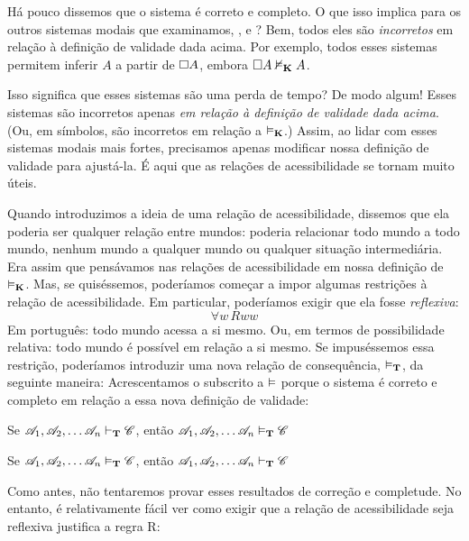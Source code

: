 Há pouco dissemos que o sistema \mlK{} é correto e completo. O que isso implica para os outros sistemas modais que examinamos, \mlT, \mlSfour{} e \mlSfive? Bem, todos eles são \emph{incorretos} em relação à definição de validade dada acima. Por exemplo, todos esses sistemas permitem inferir $A$ a partir de $\Box A$, embora $\Box A\nvDash_{\mathbf{K}} A$.

Isso significa que esses sistemas são uma perda de tempo? De modo algum! Esses sistemas são incorretos apenas \emph{em relação à definição de validade dada acima}. (Ou, em símbolos, são incorretos em relação a $\vDash_{\mathbf{K}}$.) Assim, ao lidar com esses sistemas modais mais fortes, precisamos apenas modificar nossa definição de validade para ajustá-la. É aqui que as relações de acessibilidade se tornam muito úteis.

Quando introduzimos a ideia de uma relação de acessibilidade, dissemos que ela poderia ser qualquer relação entre mundos: poderia relacionar todo mundo a todo mundo, nenhum mundo a qualquer mundo ou qualquer situação intermediária. Era assim que pensávamos nas relações de acessibilidade em nossa definição de $\vDash_{\mathbf{K}}$. Mas, se quiséssemos, poderíamos começar a impor algumas restrições à relação de acessibilidade. Em particular, poderíamos exigir que ela fosse \emph{reflexiva}:
\[\forall w\, Rww\]
Em português: todo mundo acessa a si mesmo. Ou, em termos de possibilidade relativa: todo mundo é possível em relação a si mesmo. Se impuséssemos essa restrição, poderíamos introduzir uma nova relação de consequência, $\vDash_{\mathbf{T}}$, da seguinte maneira:
Acrescentamos o subscrito \mlT{} a $\vDash$ porque o sistema \mlT{} é correto e completo em relação a essa nova definição de validade:
\begin{compactlist}
\item Se $\mathscr{A}_1,\mathscr{A}_2, \dots \mathscr{A}_n\vdash_{\mathbf{T}}\mathscr{C}$, então $\mathscr{A}_1,\mathscr{A}_2, \dots \mathscr{A}_n\vDash_{\mathbf{T}}\mathscr{C}$
\item Se $\mathscr{A}_1,\mathscr{A}_2, \dots \mathscr{A}_n\vDash_{\mathbf{T}}\mathscr{C}$, então $\mathscr{A}_1,\mathscr{A}_2, \dots \mathscr{A}_n\vdash_{\mathbf{T}}\mathscr{C}$
\end{compactlist}
Como antes, não tentaremos provar esses resultados de correção e completude. No entanto, é relativamente fácil ver como exigir que a relação de acessibilidade seja reflexiva justifica a regra R\mlT{}:

